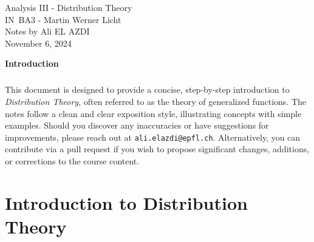 \documentclass[11pt,openany]{book}
\begin{document}
\begin{titlepage}
    \centering
    \vspace*{1cm}
    {\Huge Analysis III - Distribution Theory} \\
    \vspace{10px}
    {\LARGE IN~BA3 - Martin Werner Licht} \\
    \vspace*{1cm}
    {\Large Notes by Ali EL AZDI} \\
    \vfill
    {\large November 6, 2024}
\end{titlepage}

\begin{center}
    \vspace*{1cm}
    \textbf{Introduction}

    \paragraph[short]{}{\justifying This document is designed to provide a concise, step-by-step introduction to \textit{Distribution Theory}, often referred to as the theory of generalized functions. The notes follow a clean and clear exposition style, illustrating concepts with simple examples. Should you discover any inaccuracies or have suggestions for improvements, please reach out at \texttt{ali.elazdi@epfl.ch}. Alternatively, you can contribute via a pull request if you wish to propose significant changes, additions, or corrections to the course content.}
\end{center}

\tableofcontents

\chapter{Introduction to Distribution Theory}
\end{document}
